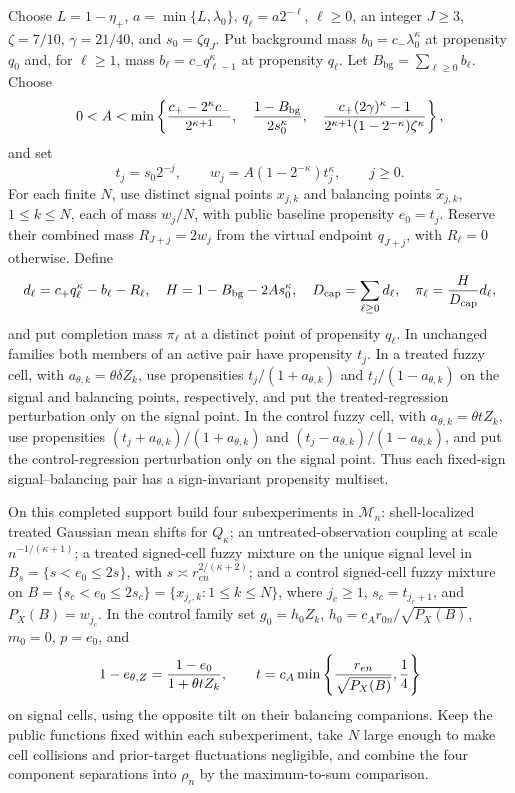 Choose \(L=1-\eta_+\), \(a=\min\lbrace L,\lambda_0\rbrace\), \(q_\ell=a2^{-\ell}\), \(\ell\geq0\), an integer \(J\geq3\), \(\zeta=7/10\), \(\gamma=21/40\), and \(s_0=\zeta q_J\). Put background mass \(b_0=c_-\lambda_0^\kappa\) at propensity \(q_0\) and, for \(\ell\geq1\), mass \(b_\ell=c_-q_{\ell-1}^\kappa\) at propensity \(q_\ell\). Let \(B_{\mathrm{bg}}=\sum_{\ell\geq0}b_\ell\). Choose
\[
0<A<\min\left\lbrace
{c_+-2^\kappa c_-\over2^{\kappa+1}},\quad
{1-B_{\mathrm{bg}}\over2s_0^\kappa},\quad
{c_+{(2\gamma)^\kappa-1}\over2^{\kappa+1}(1-2^{-\kappa})\zeta^\kappa}
\right\rbrace,
\]
and set
\[
t_j=s_0 2^{-j},\qquad
w_j=A(1-2^{-\kappa})t_j^\kappa,\qquad j\geq0.
\]
For each finite \(N\), use distinct signal points \(x_{j,k}\) and balancing points \(\widetilde x_{j,k}\), \(1\leq k\leq N\), each of mass \(w_j/N\), with public baseline propensity \(e_0=t_j\).  Reserve their combined mass \(R_{J+j}=2w_j\) from the virtual endpoint \(q_{J+j}\), with \(R_\ell=0\) otherwise.  Define
\[
d_\ell=c_+q_\ell^\kappa-b_\ell-R_\ell,\quad
H=1-B_{\mathrm{bg}}-2As_0^\kappa,\quad
D_{\mathrm{cap}}=\sum_{\ell\geq0}d_\ell,\quad
\pi_\ell={H\over D_{\mathrm{cap}}}d_\ell,
\]
and put completion mass \(\pi_\ell\) at a distinct point of propensity \(q_\ell\).  In unchanged families both members of an active pair have propensity \(t_j\).  In a treated fuzzy cell, with \(a_{\theta,k}=\theta\delta Z_k\), use propensities \(t_j/(1+a_{\theta,k})\) and \(t_j/(1-a_{\theta,k})\) on the signal and balancing points, respectively, and put the treated-regression perturbation only on the signal point.  In the control fuzzy cell, with \(a_{\theta,k}=\theta tZ_k\), use propensities \((t_j+a_{\theta,k})/(1+a_{\theta,k})\) and \((t_j-a_{\theta,k})/(1-a_{\theta,k})\), and put the control-regression perturbation only on the signal point.  Thus each fixed-sign signal--balancing pair has a sign-invariant propensity multiset.

On this completed support build four subexperiments in \(\mathcal M_n\): shell-localized treated Gaussian mean shifts for \(Q_\kappa\); an untreated-observation coupling at scale \(n^{-1/(\kappa+1)}\); a treated signed-cell fuzzy mixture on the unique signal level in \(B_s=\{s<e_0\leq2s\}\), with \(s\asymp r_{en}^{2/(\kappa+2)}\); and a control signed-cell fuzzy mixture on \(B=\{s_c<e_0\leq2s_c\}=\{x_{j_c,k}:1\leq k\leq N\}\), where \(j_c\geq1\), \(s_c=t_{j_c+1}\), and \(P_X(B)=w_{j_c}\).  In the control family set \(g_0=h_0Z_k\), \(h_0=c_A r_{0n}/\sqrt{P_X(B)}\), \(m_0=0\), \(p=e_0\), and
\[
1-e_{\theta,Z}={1-e_0\over1+\theta tZ_k},\qquad
t=c_A\min\left\{{r_{en}\over\sqrt{P_X(B)}},{1\over4}\right\}
\]
on signal cells, using the opposite tilt on their balancing companions.  Keep the public functions fixed within each subexperiment, take \(N\) large enough to make cell collisions and prior-target fluctuations negligible, and combine the four component separations into \(\rho_n\) by the maximum-to-sum comparison.

